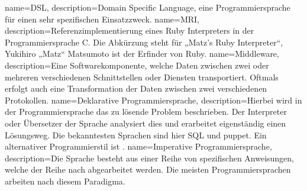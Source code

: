 {
  name=DSL,
  description={Domain Specific Language, eine Programmiersprache für einen sehr
               spezifischen Einsatzzweck.}
}
{
  name=MRI,
  description={Referenzimplementierung eines Ruby Interpreters in der
               Programmiersprache C. Die Abkürzung steht für „Matz's Ruby
               Interpreter“, Yukihiro „Matz“ Matsumoto ist der Erfinder von
               Ruby.}
}
{
  name=Middleware,
  description={Eine Softwarekomponente, welche Daten zwischen zwei oder
               mehreren verschiedenen Schnittstellen oder Diensten
               transportiert. Oftmals erfolgt auch eine Transformation
               der Daten zwischen zwei verschiedenen Protokollen.}
}
{
  name={Deklarative Programmiersprache},
  description={Hierbei wird in der Programmiersprache das zu lösende Problem
               beschrieben. Der Interpreter oder Übersetzer der Sprache
               analysiert dies und erarbeitet eigenständig einen Lösungsweg.
               Die bekanntesten Sprachen sind hier \gls{SQL} und puppet. Ein
               alternativer Programmierstil ist
               .}
}
{
  name={Imperative Programmiersprache},
  description={Die Sprache besteht aus einer Reihe von spezifischen Anweisungen,
               welche der Reihe nach abgearbeitet werden. Die meisten
               Programmiersprachen arbeiten nach diesem Paradigma.}
}
